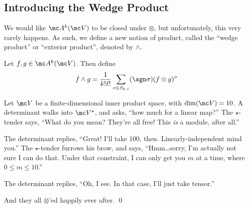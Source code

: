 \documentclass{fkbook}
\theoremstyle{snazzydefinition}
\begin{document}
  \subsection{Introducing the Wedge Product}
  We would like $\mc A^k(\mc V)$ to be closed under $\otimes$, but
  unfortunately, this very rarely happens. As such, we define a new
  notion of product, called the ``wedge product'' or ``exterior
  product'', denoted by $\wedge$.
  \begin{definition}
    Let $f,g \in \mc A^k(\mc V)$. Then define
    \[
      f \wedge g = \frac{1}{k!\ell!} \sum_{\sigma \in S_{k \cdot
          \ell}} (\sgn \sigma) (f \otimes g)^\sigma
    \]
  \end{definition}
  \begin{joke}
    Let $\mc V$ be a finite-dimensional inner product space, with
    $\dim(\mc V) = 10$. A determinant walks into $\mc V^\star$, and
    asks, ``how much for a linear map?'' The $\star$-tender says,
    ``What do you mean? They're all free! This \emph{is} a module,
    after all.''

    The determinant replies, ``Great! I'll take $100$, then.
    Linearly-independent mind you.'' The $\star$-tender furrows his
    brow, and says, ``Hmm\ldots sorry, I'm actually not sure I can do
    that. Under that constraint, I can only get you $m$ at a time,
    where $0 \leq m \leq 10$.''

    The determinant replies, ``Oh, I see. In that case, I'll just take
    tensor.''

    And they all $\otimes$'ed happily ever after. \qed
  \end{joke}
\end{document}
